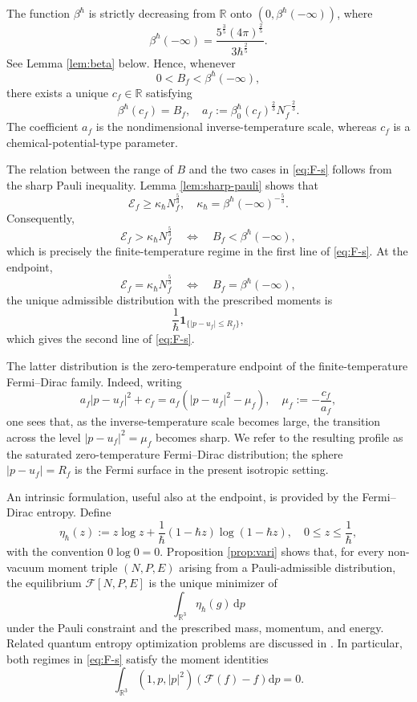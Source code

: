 \documentclass[10pt,reqno]{amsart}
\numberwithin{equation}{section}
\theoremstyle{definition}
\newcommand{\R}{\mathbb R}
\newcommand{\dpp}{\mathrm{d}p}
\newcommand{\kappah}{\kappa_{\hbar}}
\newcommand{\one}{\mathbf 1}
\newcommand{\calE}{\mathcal E}
\newcommand{\calF}{\mathcal F}
\newcommand{\lt}{\left}
\newcommand{\rt}{\right}
\begin{document}
The function $\beta^{\hbar}$ is strictly decreasing from $\R$ onto $(0,\beta^{\hbar}(-\infty))$, where
\[
 \beta^{\hbar}(-\infty)  =  \frac{5^{\frac35}(4\pi)^{\frac25}}  {3\hbar^{\frac25}}.
\]
See Lemma \ref{lem:beta} below.  Hence, whenever
\[
 0<B_f<\beta^{\hbar}(-\infty),
\]
there exists a unique $c_f\in\R$ satisfying
\[
 \beta^{\hbar}(c_f)=B_f,  \quad  a_f:=  \beta_0^{\hbar}(c_f)^{\frac23}N_f^{-\frac23}.
\]
The coefficient $a_f$ is the nondimensional inverse-temperature scale, whereas $c_f$ is a chemical-potential-type parameter.

The relation between the range of $B$ and the two cases in \eqref{eq:F-s} follows from the sharp Pauli inequality.  Lemma \ref{lem:sharp-pauli} shows that
\[
 \calE_f\geq\kappah N_f^{\frac53},  \quad  \kappah=\beta^{\hbar}(-\infty)^{-\frac53}.
\]
Consequently,
\[
 \calE_f>\kappah N_f^{\frac53}  \quad\Longleftrightarrow\quad  B_f<\beta^{\hbar}(-\infty),
\]
which is precisely the finite-temperature regime in the first line of \eqref{eq:F-s}.  At the endpoint,
\[
 \calE_f=\kappah N_f^{\frac53}  \quad\Longleftrightarrow\quad  B_f=\beta^{\hbar}(-\infty),
\]
the unique admissible distribution with the prescribed moments
is
\[
 \frac1\hbar  \one_{\{|p-u_f|\leq R_f\}},
\]
which gives the second line of \eqref{eq:F-s}.

The latter distribution is the zero-temperature endpoint of the finite-temperature Fermi--Dirac family.  Indeed, writing
\[
 a_f|p-u_f|^2+c_f  =  a_f\lt(|p-u_f|^2-\mu_f\rt),  \quad  \mu_f:=-\frac{c_f}{a_f},
\]
one sees that, as the inverse-temperature scale becomes large, the transition across the level $|p-u_f|^2=\mu_f$ becomes sharp.  We refer to the resulting profile as the saturated zero-temperature Fermi--Dirac distribution; the sphere $|p-u_f|=R_f$ is the Fermi surface in the present isotropic setting.

An intrinsic formulation, useful also at the endpoint, is provided by the Fermi--Dirac entropy.  Define
\[
 \eta_\hbar(z)  :=  z\log z  +\frac1\hbar(1-\hbar z)\log(1-\hbar z),  \quad  0\leq z\leq\frac1\hbar ,
\]
with the convention $0\log0=0$. Proposition \ref{prop:vari} shows that, for every non-vacuum moment triple $(N,P,E)$ arising from a Pauli-admissible distribution, the equilibrium $\calF[N,P,E]$ is the unique minimizer of
\[
 \int_{\R^3}\eta_\hbar(g)\,\dpp
\]
under the Pauli constraint and the prescribed mass, momentum, and energy.  Related quantum entropy optimization problems are discussed in \cite{EMV05}.  In particular, both regimes in \eqref{eq:F-s} satisfy the moment identities
\[
 \int_{\R^3}(1,p,|p|^2)  \lt(\calF(f)-f\rt) \dpp=0.
\]
\end{document}
